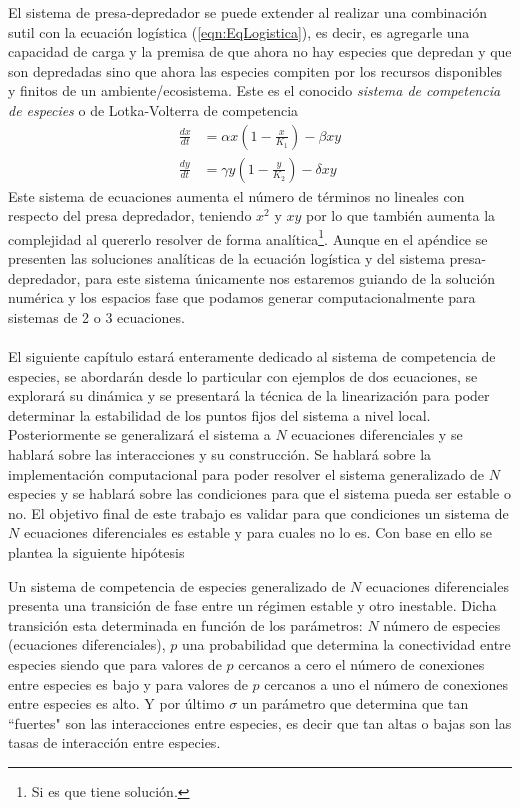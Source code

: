 El sistema de presa-depredador se puede extender al realizar una combinación sutil con la ecuación logística (\ref{eqn:EqLogistica}), es decir, es agregarle una capacidad de carga y la premisa de que ahora no hay especies que depredan y que son depredadas sino que ahora las especies compiten por los recursos disponibles y finitos de un ambiente/ecosistema. Este es el conocido \textit{sistema de competencia de especies} o de Lotka-Volterra de competencia
\begin{equation}\label{eqn:CompentenciaEspecies2x2}
	\begin{split}
		\frac{dx}{dt} &= \alpha x\left (1-\frac{x}{K_1}\right )-\beta xy\\
		\frac{dy}{dt} &= \gamma y\left (1-\frac{y}{K_2}\right )-\delta xy
	\end{split}
\end{equation}
Este sistema de ecuaciones aumenta el número de términos no lineales con respecto del presa depredador, teniendo $x^2$ y $xy$ por lo que también aumenta la complejidad al quererlo resolver de forma analítica\footnote{Si es que tiene solución.}. Aunque en el apéndice se presenten las soluciones analíticas de la ecuación logística y del sistema presa-depredador, para este sistema únicamente nos estaremos guiando de la solución numérica y los espacios fase que podamos generar computacionalmente para sistemas de 2 o 3 ecuaciones.\\
\\
El siguiente capítulo estará enteramente dedicado al sistema de competencia de especies, se abordarán desde lo particular con ejemplos de dos ecuaciones, se explorará su dinámica y se presentará la técnica de la linearización para poder determinar la estabilidad de los puntos fijos del sistema a nivel local. Posteriormente se generalizará el sistema a $N$ ecuaciones diferenciales y se hablará sobre las interacciones y su construcción. Se hablará sobre la implementación computacional para poder resolver el sistema generalizado de $N$ especies y se hablará sobre las condiciones para que el sistema pueda ser estable o no. El objetivo final de este trabajo es validar para que condiciones un sistema de $N$ ecuaciones diferenciales es estable y para cuales no lo es. Con base en ello se plantea la siguiente hipótesis
\begin{proposición}
	Un sistema de competencia de especies generalizado de $N$ ecuaciones diferenciales presenta una transición de fase entre un régimen estable y otro inestable. Dicha transición esta determinada en función de los parámetros: $N$ número de especies (ecuaciones diferenciales), $p$ una probabilidad que determina la conectividad entre especies siendo que para valores de $p$ cercanos a cero el número de conexiones entre especies es bajo y para valores de $p$ cercanos a uno el número de conexiones entre especies es alto. Y por último $\sigma$ un parámetro que determina que tan ``fuertes" son las interacciones entre especies, es decir que tan altas o bajas son las tasas de interacción entre especies. 
\end{proposición}

